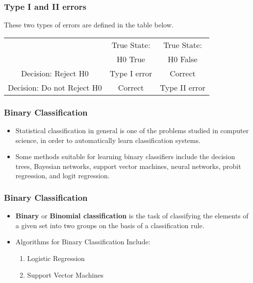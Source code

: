 \documentclass[a4]{beamer}
\begin{document}
\begin{frame}
	\frametitle{Type I and II errors}
	\large
	These two types of errors are defined in the table below.
\Large
	\begin{center}
		\begin{tabular}{|c|c|c|}
			\hline
			& True State:  & True State: \\
			& H0 True & H0 False \\
			
			\hline
			Decision: Reject H0 & Type I error& Correct\\\hline
			Decision: Do not Reject H0 & Correct &Type II error\\ \hline
		\end{tabular}
	\end{center}
\end{frame}
\begin{frame}
	\frametitle{Binary Classification}
	\large
	\begin{itemize}
		\item 
	Statistical classification in general is one of the problems studied in computer science, in order to automatically learn classification systems. \smallskip
	\item Some methods suitable for learning binary classifiers include the decision trees, Bayesian networks, support vector machines, neural networks, probit regression, and logit regression.
	\end{itemize}
\end{frame}
\begin{frame}
	\frametitle{Binary Classification}
	\large
\begin{itemize}
\item 	\textbf{Binary} or \textbf{Binomial classification} is the task of classifying the elements of a given set into two groups on the basis of a classification rule.
\item Algorithms for Binary Classification Include:
\begin{enumerate}
	\item Logistic Regression
	\item Support Vector Machines
\end{enumerate}
\end{itemize}
\end{frame}
\end{document}
